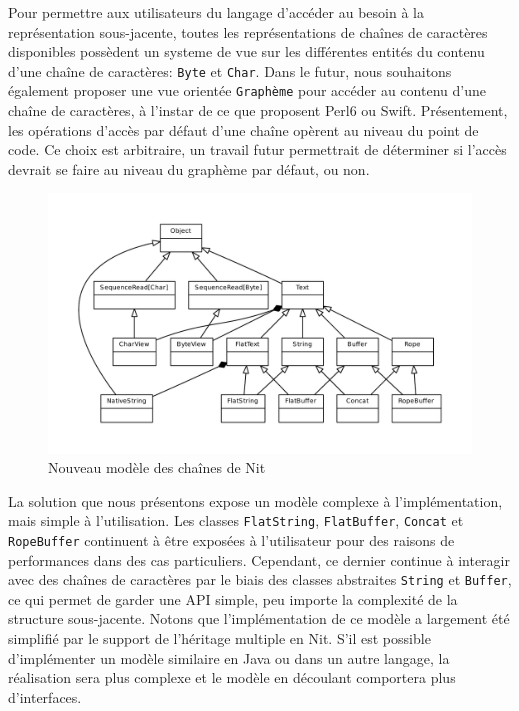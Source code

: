 Pour permettre aux utilisateurs du langage d'accéder au besoin à la représentation sous-jacente,
toutes les représentations de chaînes de caractères disponibles possèdent un systeme de vue sur les différentes
entités du contenu d'une chaîne de caractères: \texttt{Byte} et \texttt{Char}.
Dans le futur, nous souhaitons également proposer une vue orientée \texttt{Graphème} pour accéder au contenu
d'une chaîne de caractères, à l'instar de ce que proposent Perl6 ou Swift.
Présentement, les opérations d'accès par défaut d'une chaîne opèrent au niveau du point de code.
Ce choix est arbitraire, un travail futur permettrait de déterminer si l'accès devrait
se faire au niveau du graphème par défaut, ou non.

\begin{figure}
	\caption{Nouveau mod\`{e}le des chaînes de Nit}
	\label{newmodel}
	\centering
	\includegraphics[angle=90]{figures/new_model.pdf}
\end{figure}

La solution que nous présentons expose un modèle complexe à l'implémentation, mais simple à l'utilisation.
Les classes \texttt{FlatString}, \texttt{FlatBuffer}, \texttt{Concat} et \texttt{RopeBuffer} continuent
à être exposées à l'utilisateur pour des raisons de performances dans des cas particuliers.
Cependant, ce dernier continue à interagir avec des chaînes de caractères par le biais des classes abstraites
\texttt{String} et \texttt{Buffer}, ce qui permet de garder une API simple, peu importe la complexité
de la structure sous-jacente.
Notons que l'implémentation de ce modèle a largement été simplifié par le support de l'héritage
multiple en Nit.
S'il est possible d'implémenter un modèle similaire en Java ou dans un autre langage, la réalisation
sera plus complexe et le modèle en découlant comportera plus d'interfaces.

